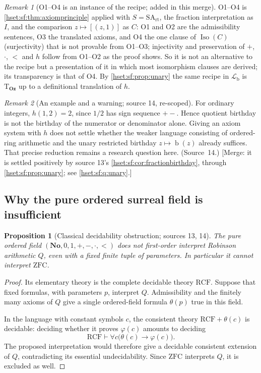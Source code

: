 \documentclass[11pt,letterpaper]{article}
\newtheorem{proposition}[proposition]{Proposition}\aliascntresetthe{proposition}
\theoremstyle{definition}
\theoremstyle{remark}
\newtheorem{remark}[remark]{Remark}\aliascntresetthe{remark}
\newcommand{\No}{\mathbf{No}}
\newcommand{\bd}{\operatorname{b}}
\newcommand{\ZFC}{\mathrm{ZFC}}
\newcommand{\Oz}{\mathbf{Oz}}
\newcommand{\RCF}{\mathrm{RCF}}
\newcommand{\Lb}{\mathcal L_{\mathrm b}}
\newcommand{\Tth}{\mathrm{T}}
\newcommand{\SArt}{\mathrm{SA}_{\mathrm{rt}}}
\begin{document}
\begin{remark}[O1--O4 is an instance of the recipe; added in this merge]
\label{hset:sf:rem:oaqb}
O1--O4 is \cref{hset:sf:thm:axiomprinciple} applied with $S=\SArt$, the
fraction interpretation as $I$, and the comparison $z\mapsto[(z,1)]$ as $C$: O1 and
O2 are the admissibility sentences, O3 the translated axioms, and O4 the one
clause of $\operatorname{Iso}(C)$ (surjectivity) that is not provable from O1--O3;
injectivity and preservation of $+$, $\cdot$, $<$ and $h$ follow from O1--O2 as the
proof shows. So it is not an alternative to the recipe but a presentation of it in
which most isomorphism clauses are derived; its transparency is that of O4. By
\cref{hset:sf:prop:unary} the same recipe in $\Lb$ is $\Tth_{\Oz}$ up to a
definitional translation of $h$.
\end{remark}

\begin{remark}[An example and a warning; source 14, re-scoped]\label{hset:sf:rem:warning}
For ordinary integers, $h(1,2)=2$, since $1/2$ has sign sequence $+-$. Hence
quotient birthday is not the birthday of the numerator or denominator alone.
Giving an axiom system with $h$ does not settle whether the weaker language
consisting of ordered-ring arithmetic and the unary restricted birthday
$z\mapsto\bd(z)$ already suffices. That precise reduction remains a research
question here. (Source~14.) [Merge: it is settled positively by source 13's
\cref{hset:sf:cor:fractionbirthday}, through \cref{hset:sf:prop:unary}; see
\cref{hset:sf:q:unary}.]
\end{remark}

\subsection{Why the pure ordered surreal field is insufficient}

\begin{proposition}[Classical decidability obstruction; sources 13, 14]\label{hset:sf:prop:rcf}
The pure ordered field $(\No,0,1,+,-,\cdot,<)$ does not first-order interpret
Robinson arithmetic $Q$, even with a fixed finite tuple of parameters. In
particular it cannot interpret $\ZFC$.
\end{proposition}
\begin{proof}
Its elementary theory is the complete decidable theory $\RCF$. Suppose that fixed
formulas, with parameters $p$, interpret $Q$. Admissibility and the finitely many
axioms of $Q$ give a single ordered-field formula $\theta(p)$ true in this field.

In the language with constant symbols $c$, the consistent theory
$\RCF+\theta(c)$ is decidable: deciding whether it proves $\varphi(c)$ amounts to
deciding
\[
 \RCF\vdash\forall c\bigl(\theta(c)\to\varphi(c)\bigr).
\]
The proposed interpretation would therefore give a decidable consistent extension
of $Q$, contradicting its essential undecidability. Since $\ZFC$ interprets $Q$,
it is excluded as well.
\end{proof}
\end{document}
